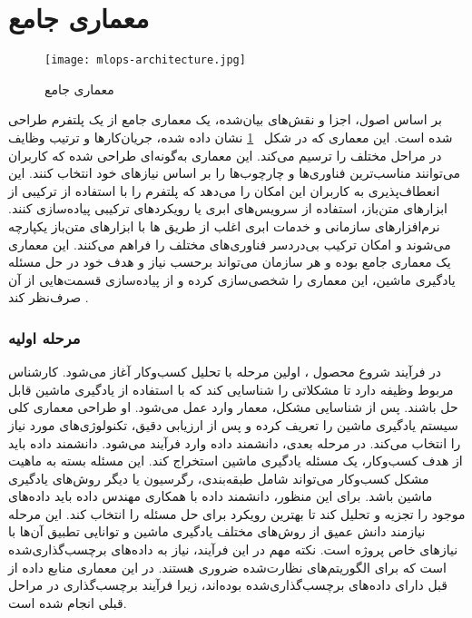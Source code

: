 \section{معماری جامع}
 \begin{figure}[!b]
 	\centering
 	\texttt{[image: mlops-architecture.jpg]}
 	\caption{معماری جامع  \cite{basearticle}}
 	\label{fig: mlops architecture}
 \end{figure}
 
 بر اساس اصول، اجزا و نقش‌های بیان‌شده، یک معماری جامع از یک پلتفرم  طراحی شده است. این معماری که در شکل 
 ~\ref{fig: mlops architecture}
 نشان داده شده، جریان‌کارها و ترتیب وظایف در مراحل مختلف را ترسیم می‌کند. این معماری به‌گونه‌ای طراحی شده که کاربران می‌توانند مناسب‌ترین فناوری‌ها و چارچوب‌ها را بر اساس نیازهای خود انتخاب کنند. این انعطاف‌پذیری به کاربران این امکان را می‌دهد که پلتفرم  را با استفاده از ترکیبی از ابزارهای متن‌باز، استفاده از سرویس‌های ابری یا رویکردهای ترکیبی پیاده‌سازی کنند. نرم‌افزارهای سازمانی و خدمات ابری اغلب از طریق ‌ها با ابزارهای متن‌باز یکپارچه می‌شوند و امکان ترکیب بی‌دردسر فناوری‌های مختلف را فراهم می‌کنند. این معماری یک معماری جامع بوده و هر سازمان می‌تواند برحسب نیاز و هدف خود در حل مسئله یادگیری ماشین، این معماری را شخصی‌سازی کرده و از پیاده‌سازی قسمت‌هایی از آن صرف‌نظر کند \cite{basearticle}.
 

\subsubsection{مرحله اولیه}
در فرآیند شروع محصول ، اولین مرحله با تحلیل کسب‌وکار آغاز می‌شود. کارشناس مربوط وظیفه دارد تا مشکلاتی را شناسایی کند که با استفاده از یادگیری ماشین قابل حل باشند. پس از شناسایی مشکل، معمار وارد عمل می‌شود. او طراحی معماری کلی سیستم یادگیری ماشین را تعریف کرده و پس از ارزیابی دقیق، تکنولوژی‌های مورد نیاز را انتخاب می‌کند. در مرحله بعدی، دانشمند داده وارد فرآیند می‌شود. دانشمند داده باید از هدف کسب‌وکار، یک مسئله یادگیری ماشین استخراج کند. این مسئله بسته به ماهیت مشکل کسب‌وکار می‌تواند شامل طبقه‌بندی، رگرسیون یا دیگر روش‌های یادگیری ماشین باشد. برای این منظور، دانشمند داده با همکاری مهندس داده باید داده‌های موجود را تجزیه و تحلیل کند تا بهترین رویکرد برای حل مسئله را انتخاب کند. این مرحله نیازمند دانش عمیق از روش‌های مختلف یادگیری ماشین و توانایی تطبیق آن‌ها با نیازهای خاص پروژه است. نکته مهم در این فرآیند، نیاز به داده‌های برچسب‌گذاری‌شده است که برای الگوریتم‌های نظارت‌شده ضروری هستند. در این معماری منابع داده از قبل دارای داده‌های برچسب‌گذاری‌شده بوده‌اند، زیرا فرآیند برچسب‌گذاری در مراحل قبلی انجام شده است.


